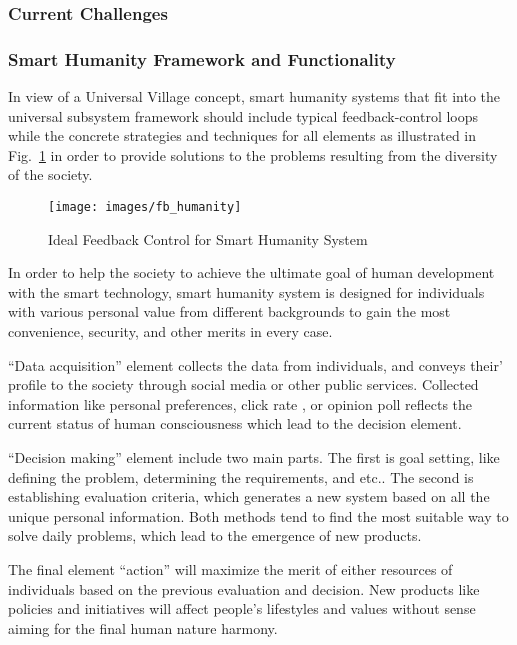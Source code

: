 \documentclass[letterpaper, twocolumn, 10pt, conference]{IEEEtran}
\begin{document}
\subsubsection{Current Challenges}
\label{sssec:css:smart_humanity:challenges}


\subsubsection{Smart Humanity Framework and Functionality}
\label{sssec:css:smart_humanity:framework}

In view of a Universal Village concept, smart humanity systems that fit into the universal subsystem framework should include typical feedback-control loops while the concrete strategies and techniques for all elements as illustrated in Fig.~\ref{fig:css:smart_humanity_feedback} in order to provide solutions to the problems resulting from the diversity of the society.

\begin{figure}[h!]
        \centering
        \texttt{[image: images/fb\_humanity]}
        \caption{Ideal Feedback Control for Smart Humanity System}
        \label{fig:css:smart_humanity_feedback}
\end{figure}

In order to help the society to achieve the ultimate goal of human development with the smart technology, smart humanity system is designed for individuals with various personal value from different backgrounds to gain the most convenience, security, and other merits in every case. 

\enquote{Data acquisition} element collects the data from individuals, and conveys their’ profile to the society through social media or other public services. Collected information like personal preferences, click rate , or opinion poll reflects the current status of human consciousness which lead to the decision element. 

\enquote{Decision making} element include two main parts. The first is goal setting, like defining the problem, determining the requirements, and etc.. The second is establishing evaluation criteria, which generates a new system based on all the unique personal information. Both methods tend to find the most suitable way to solve daily problems, which lead to the emergence of new products.

The final element \enquote{action} will maximize the merit of either resources of individuals based on the previous evaluation and decision. New products like policies and initiatives will affect people's lifestyles and values without sense aiming for the final human nature harmony. 
\end{document}
